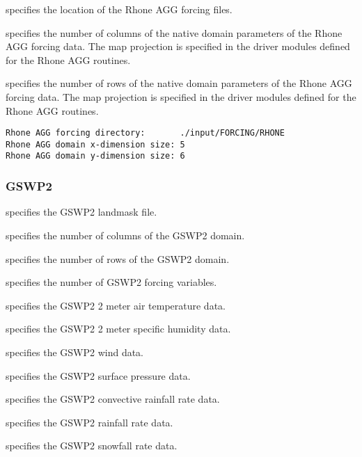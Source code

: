  
  specifies the location of the
 Rhone AGG forcing files.

  specifies the number of
 columns of the native domain parameters of the Rhone AGG forcing data.
 The map projection is specified in the driver modules defined for
 the Rhone AGG routines.

  specifies the number of
 rows of the native domain parameters of the Rhone AGG forcing data.
 The map projection is specified in the driver modules defined for
 the Rhone AGG routines.
 

 \begin{Verbatim}[frame=single]
Rhone AGG forcing directory:       ./input/FORCING/RHONE
Rhone AGG domain x-dimension size: 5 
Rhone AGG domain y-dimension size: 6
 \end{Verbatim}

 
 \subsubsection{GSWP2} \label{sssec:forcings_gswp2}
 

 
  specifies the GSWP2 landmask file.

  specifies the number of columns
 of the GSWP2 domain.

  specifies the number of rows
 of the GSWP2 domain.

  specifies the number of
 GSWP2 forcing variables.

  specifies the GSWP2 2 meter
 air temperature data.

  specifies the GSWP2 2 meter
 specific humidity data.

  specifies the GSWP2 wind data.

  specifies the GSWP2 surface
 pressure data.

  specifies the GSWP2
 convective rainfall rate data.

  specifies the GSWP2
 rainfall rate data.

  specifies the GSWP2
 snowfall rate data.

